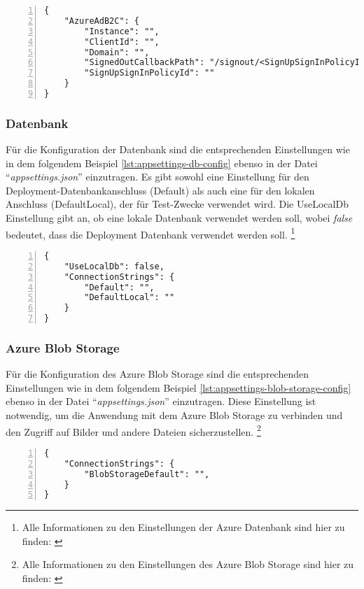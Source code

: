 \begin{lstlisting}[numbers=left,caption={appsettings.json},label={lst:appsettings-auth-config}]
{
    "AzureAdB2C": {
        "Instance": "",
        "ClientId": "",
        "Domain": "",
        "SignedOutCallbackPath": "/signout/<SignUpSignInPolicyId>",
        "SignUpSignInPolicyId": ""
    }
}
\end{lstlisting}

\subsubsection{Datenbank}

Für die Konfiguration der Datenbank sind die entsprechenden Einstellungen wie in dem folgendem
Beispiel \ref{lst:appsettings-db-config} ebenso in der Datei ``\emph{appsettings.json}'' 
einzutragen. Es gibt sowohl eine Einstellung für den Deployment-Datenbankanschluss (Default) 
als auch eine für den lokalen Anschluss (DefaultLocal), der für Test-Zwecke verwendet wird. 
Die UseLocalDb Einstellung gibt an, ob eine lokale Datenbank verwendet werden soll, wobei
\emph{false} bedeutet, dass die Deployment Datenbank verwendet werden soll.
\footnote{Alle Informationen zu den Einstellungen der Azure Datenbank sind hier zu finden: \cite{MicrosoftCorporationl}}

\begin{lstlisting}[numbers=left,caption={appsettings.json},label={lst:appsettings-db-config}]
{
    "UseLocalDb": false,
    "ConnectionStrings": {
        "Default": "",
        "DefaultLocal": ""
    }
}
\end{lstlisting}

\subsubsection{Azure Blob Storage}

Für die Konfiguration des Azure Blob Storage sind die entsprechenden Einstellungen wie in 
dem folgendem Beispiel \ref{lst:appsettings-blob-storage-config} ebenso in der Datei 
``\emph{appsettings.json}'' einzutragen. Diese Einstellung ist notwendig, um die 
Anwendung mit dem Azure Blob Storage zu verbinden und den Zugriff auf Bilder und 
andere Dateien sicherzustellen.
\footnote{Alle Informationen zu den Einstellungen des Azure Blob Storage sind hier zu finden: \cite{MicrosoftCorporationm}}

\begin{lstlisting}[numbers=left,caption={appsettings.json},label={lst:appsettings-blob-storage-config}]
{
    "ConnectionStrings": {
        "BlobStorageDefault": "",
    }
}
\end{lstlisting}


